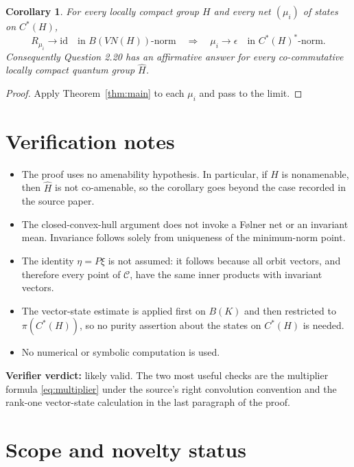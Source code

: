 \documentclass[11pt]{article}
\newtheorem{corollary}[theorem]{Corollary}
\newcommand{\C}{\mathcal{C}}
\newcommand{\id}{\mathrm{id}}
\begin{document}
\begin{corollary}\label{cor:net}
For every locally compact group $H$ and every net $(\mu_i)$ of states on
$C^*(H)$,
\[
  R_{\mu_i}\longrightarrow\id
  \quad\text{in }B(VN(H))\text{-norm}
  \quad\Longrightarrow\quad
  \mu_i\longrightarrow\epsilon
  \quad\text{in }C^*(H)^*\text{-norm}.
\]
Consequently Question 2.20 has an affirmative answer for every
co-commutative locally compact quantum group $\widehat H$.
\end{corollary}

\begin{proof}
Apply Theorem~\ref{thm:main} to each $\mu_i$ and pass to the limit.
\end{proof}

\section{Verification notes}

\begin{itemize}
  \item The proof uses no amenability hypothesis. In particular, if $H$ is
  nonamenable, then $\widehat H$ is not co-amenable, so the corollary goes
  beyond the case recorded in the source paper.
  \item The closed-convex-hull argument does not invoke a Følner net or an
  invariant mean. Invariance follows solely from uniqueness of the
  minimum-norm point.
  \item The identity $\eta=P\xi$ is not assumed: it follows because all orbit
  vectors, and therefore every point of $\C$, have the same inner products
  with invariant vectors.
  \item The vector-state estimate is applied first on $B(K)$ and then
  restricted to $\pi(C^*(H))$, so no purity assertion about the states on
  $C^*(H)$ is needed.
  \item No numerical or symbolic computation is used.
\end{itemize}

\noindent\textbf{Verifier verdict:} likely valid. The two most useful checks
are the multiplier formula \eqref{eq:multiplier} under the source's right
convolution convention and the rank-one vector-state calculation in the last
paragraph of the proof.

\section{Scope and novelty status}
\end{document}
